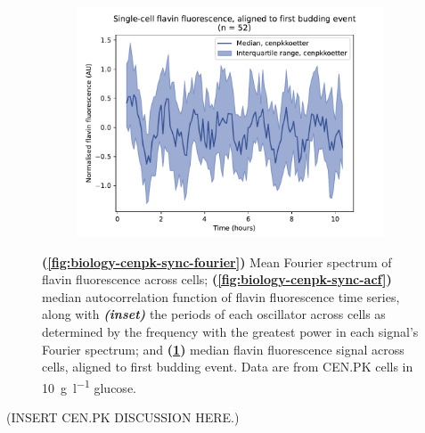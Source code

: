 \begin{figure}
  \begin{subfigure}[htpb]{0.45\textwidth}
   \centering
   \includegraphics[width=\textwidth]{cenpkkoetter_20212_6.pdf}
   \caption{
   }
   \label{fig:biology-cenpk-sync-median}
  \end{subfigure}

  \caption{
    \textbf{(\ref{fig:biology-cenpk-sync-fourier})} Mean Fourier spectrum of flavin fluorescence across cells; \textbf{(\ref{fig:biology-cenpk-sync-acf})} median autocorrelation function of flavin fluorescence time series, along with \textit{\textbf{(inset)}} the periods of each oscillator across cells as determined by the frequency with the greatest power in each signal's Fourier spectrum; and
    \textbf{(\ref{fig:biology-cenpk-sync-median})}
    median flavin fluorescence signal across cells, aligned to first budding event.
    Data are from CEN.PK cells in \SI{10}{\gram~\litre^{-1}} glucose.
  }
  \label{fig:biology-cenpk-sync}
\end{figure}

(INSERT CEN.PK DISCUSSION HERE.)


